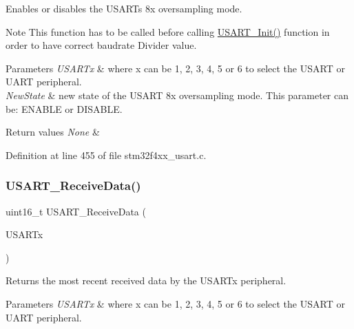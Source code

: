 Enables or disables the U\+S\+A\+RT\textquotesingle{}s 8x oversampling mode. 

\begin{DoxyNote}{Note}
This function has to be called before calling \hyperlink{group___u_s_a_r_t___group1_ga98da340ea0324002ba1b4263e91ab2ff}{U\+S\+A\+R\+T\+\_\+\+Init()} function in order to have correct baudrate Divider value. 
\end{DoxyNote}

\begin{DoxyParams}{Parameters}
{\em U\+S\+A\+R\+Tx} & where x can be 1, 2, 3, 4, 5 or 6 to select the U\+S\+A\+RT or U\+A\+RT peripheral. \\
\hline
{\em New\+State} & new state of the U\+S\+A\+RT 8x oversampling mode. This parameter can be\+: E\+N\+A\+B\+LE or D\+I\+S\+A\+B\+LE. \\
\hline
\end{DoxyParams}

\begin{DoxyRetVals}{Return values}
{\em None} & \\
\hline
\end{DoxyRetVals}


Definition at line 455 of file stm32f4xx\+\_\+usart.\+c.

\mbox{\label{group___u_s_a_r_t_gac67a91845b0b1d54d31bdfb1c5e9867c}} 
\subsubsection{\texorpdfstring{U\+S\+A\+R\+T\+\_\+\+Receive\+Data()}{USART\_ReceiveData()}}
{\footnotesize\ttfamily uint16\+\_\+t U\+S\+A\+R\+T\+\_\+\+Receive\+Data (\begin{DoxyParamCaption}\item[{\hyperlink{struct_u_s_a_r_t___type_def}{U\+S\+A\+R\+T\+\_\+\+Type\+Def} $\ast$}]{U\+S\+A\+R\+Tx }\end{DoxyParamCaption})}



Returns the most recent received data by the U\+S\+A\+R\+Tx peripheral. 


\begin{DoxyParams}{Parameters}
{\em U\+S\+A\+R\+Tx} & where x can be 1, 2, 3, 4, 5 or 6 to select the U\+S\+A\+RT or U\+A\+RT peripheral. \\
\hline
\end{DoxyParams}

